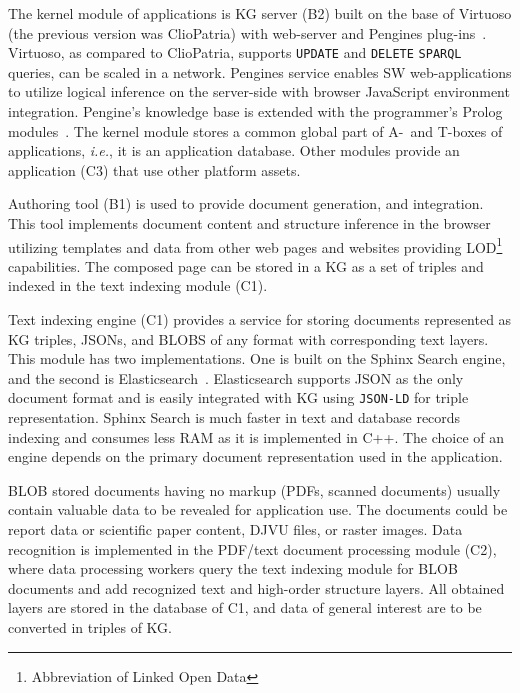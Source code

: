 \documentclass[
]{ceurart}
\begin{document}
The kernel module of applications is KG server (B2) built on the base of Virtuoso (the previous version was ClioPatria) with web-server and Pengines plug-ins~\cite{pengines}.  %
Virtuoso, as compared to ClioPatria, supports \verb|UPDATE| and \verb|DELETE| \verb|SPARQL| queries, can be scaled in a network.  Pengines service enables SW web-applications to utilize logical inference on the server-side with browser JavaScript environment integration.  Pengine's knowledge base is extended with the programmer's Prolog modules~\cite{b10,swi}.  The kernel module stores a common global part of A-~and T-boxes of applications, \emph{i.e.}, it is an application database.  Other modules provide an application (C3) that use other platform assets.

Authoring tool (B1) \cite{authoring,zont19} is used to provide document generation, and integration.  This tool implements document content and structure inference in the browser utilizing templates and data from other web pages and websites providing LOD\footnote{Abbreviation of Linked Open Data} \cite{b1,c6} capabilities. The composed page can be stored in a KG as a set of triples and indexed in the text indexing module (C1).

Text indexing engine (C1)  provides a service for storing documents represented as KG triples, JSONs, and BLOBS of any format with corresponding text layers.  This module has two implementations.  One is built on the Sphinx Search engine, and the second is Elasticsearch~\cite{b13}.  Elasticsearch supports JSON as the only document format and is easily integrated with KG using \verb|JSON-LD| for triple representation.  Sphinx Search is much faster in text and database records indexing and consumes less RAM as it is implemented in C++.  The choice of an engine depends on the primary document representation used in the application.

BLOB stored documents having no markup (PDFs, scanned documents) usually contain valuable data to be revealed for application use.  The documents could be report data or scientific paper content, DJVU files, or raster images.  Data recognition is implemented in the PDF/text document processing module (C2), where data processing workers query the text indexing module for BLOB documents and add recognized text and high-order structure layers.  All obtained layers are stored in the database of C1, and data of general interest are to be converted in triples of KG.
\end{document}
